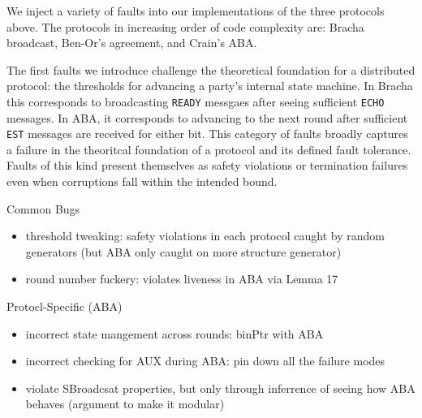 We inject a variety of faults into our implementations of the three protocols above.
The protocols in increasing order of code complexity are: Bracha broadcast, Ben-Or's agreement, and Crain's ABA.

The first faults we introduce challenge the theoretical foundation for a distributed protocol: the thresholds for advancing a party's internal state machine. 
In Bracha this corresponds to broadcasting \texttt{READY} messgaes after seeing sufficient \texttt{ECHO} messages.
In ABA, it corresponds to advancing to the next round after sufficient \texttt{EST} messages are received for either bit. 
This category of faults broadly captures a failure in the theoritcal foundation of a protocol and its defined fault tolerance. 
Faults of this kind present themselves as safety violations or termination failures even when corruptions fall within the intended bound.

Common Bugs
\begin{itemize}
\item threshold tweaking: safety violations in each protocol caught by random generators (but ABA only caught on more structure generator)
\item round number fuckery: violates liveness in ABA via Lemma 17
\end{itemize}

Protocl-Specific (ABA)
\begin{itemize}
\item incorrect state mangement across rounds: binPtr with ABA
\item incorrect checking for AUX during ABA: pin down all the failure modes
\item violate SBroadcsat properties, but only through inferrence of seeing how ABA behaves (argument to make it modular)
\end{itemize}







